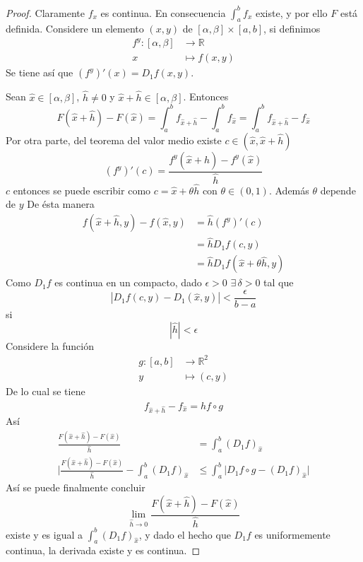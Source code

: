 \begin{proof}
 Claramente $f_x$ es continua. En consecuencia $\int_a^b f_x$ existe, y por ello
 $F$ está definida. Considere un elemento $(x,y)$ de $[\alpha, \beta] \times
 [a,b]$, si definimos
 \begin{align*}
   f^y: [\alpha,\beta] &\to \mathbb{R} \\
   x &\mapsto f(x,y)
 \end{align*}
 Se tiene así que $(f^y)'(x) = D_1f(x,y)$.

 Sean $\hat{x} \in [\alpha, \beta]$, $\hat{h} \neq 0$ y $\hat{x} + \hat{h} \in
 [\alpha, \beta]$. Entonces
 \[
   F(\hat{x} + \hat{h}) - F(\hat{x}) = \int_a^b f_{\hat{x} + \hat{h}} - \int_a^b
 f_{\hat{x}} = \int_a^b f_{\hat{x} + \hat{h}} - f_{\hat{x}} 
 \]
 Por otra parte, del teorema del valor medio existe $c \in (\hat{x},\hat{x} +
 \hat{h})$
 \[
   (f^y)'(c) = \frac{f^y(\hat{x} + \hat{h}) - f^y(\hat{x})}{\hat{h}}
 \]
 $c$ entonces  se puede escribir como $c = \hat{x} + \theta\hat{h}$ con $\theta
 \in (0,1)$. Además $\theta$ depende de $y$
  De ésta manera
  \begin{align*}
    f(\hat{x} + \hat{h}, y) - f(\hat{x}, y) &= \hat{h}(f^y)'(c) \\ 
    &= \hat{h}D_1f(c,y) \\ 
    &= \hat{h}D_1f(\hat{x} + \theta \hat{h},y) 
  \end{align*}
  Como $D_1f$ es continua en un compacto, dado $\epsilon > 0$
  $\exists \, \delta > 0$ tal que 
  \[
    |D_1f(c, y) - D_1(\hat{x}, y)| < \frac{\epsilon}{ b-a}
  \]
  si
  \[
    |\hat{h}| < \epsilon
  \]
  Considere la función 
  \begin{align*}
    g: [a,b] &\to \mathbb{R}^2 \\
    y &\mapsto (c,y)
  \end{align*}
  De lo cual se tiene
  \[
    f_{\hat{x} + \hat{h}} - f_{\hat{x}} = \hat{h} f \circ g
  \]
  Así
  \begin{align*}
    \frac{F( \hat{x} + \hat{h}) - F(\hat{x})}{\hat{h}} &= \int_a^b (D_1
    f)_{\hat{x}} \\ 
    \big| \frac{F( \hat{x} + \hat{h}) - F(\hat{x})}{\hat{h}} - \int_a^b (D_1
    f)_{\hat{x}} &\leq \int_a^b \big| D_1f\circ g - (D_1f)_{\hat{x}} \big|
  \end{align*}
  Así se puede finalmente concluir 
  \[
    \lim_{\hat{h} \to 0} \frac{F(\hat{x} + \hat{h}) - F(\hat{x})}{\hat{h}}
  \]
  existe y es igual a $\int_a^b (D_1 f)_{\hat{x}}$, y dado el hecho que $D_1f$
  es uniformemente continua, la derivada existe y es continua.
\end{proof}
